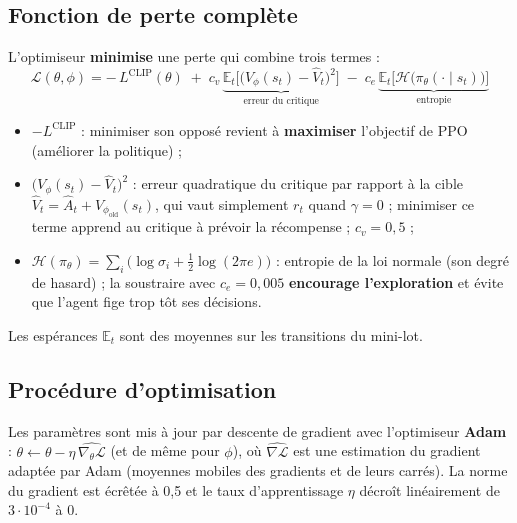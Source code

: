 \documentclass[11pt,a4paper]{article}
\newcommand{\E}{\mathbb{E}}
\begin{document}
\subsection{Fonction de perte complète}
L'optimiseur \textbf{minimise} une perte qui combine trois termes :
\begin{equation}
  \boxed{\;\mathcal L(\theta,\phi)=-\,L^{\text{CLIP}}(\theta)
  \;+\;c_v\,\underbrace{\E_t\Big[\big(V_\phi(s_t)-\hat V_t\big)^2\Big]}_{\text{erreur du critique}}
  \;-\;c_e\,\underbrace{\E_t\Big[\mathcal H\big(\pi_\theta(\cdot\mid s_t)\big)\Big]}_{\text{entropie}}\;}
\end{equation}
\begin{itemize}
  \item \(-L^{\text{CLIP}}\) : minimiser son opposé revient à \textbf{maximiser} l'objectif de PPO (améliorer
        la politique) ;
  \item \(\big(V_\phi(s_t)-\hat V_t\big)^2\) : erreur quadratique du critique par rapport à la cible
        \(\hat V_t=\hat A_t+V_{\phi_{\text{old}}}(s_t)\), qui vaut simplement \(r_t\) quand \(\gamma=0\) ; minimiser
        ce terme apprend au critique à prévoir la récompense ; \(c_v=0{,}5\) ;
  \item \(\mathcal H(\pi_\theta)=\sum_i\big(\log\sigma_i+\tfrac12\log(2\pi e)\big)\) : entropie de la loi normale
        (son degré de hasard) ; la soustraire avec \(c_e=0{,}005\) \textbf{encourage l'exploration} et évite que
        l'agent fige trop tôt ses décisions.
\end{itemize}
Les espérances \(\E_t\) sont des moyennes sur les transitions du mini-lot.

\subsection{Procédure d'optimisation}
Les paramètres sont mis à jour par descente de gradient avec l'optimiseur \textbf{Adam} :
\(\theta\leftarrow\theta-\eta\,\widehat{\nabla_\theta\mathcal L}\) (et de même pour \(\phi\)), où
\(\widehat{\nabla\mathcal L}\) est une estimation du gradient adaptée par Adam (moyennes mobiles des gradients et de
leurs carrés). La norme du gradient est écrêtée à 0,5 et le taux d'apprentissage \(\eta\) décroît linéairement de
\(3\cdot10^{-4}\) à 0.
\end{document}
